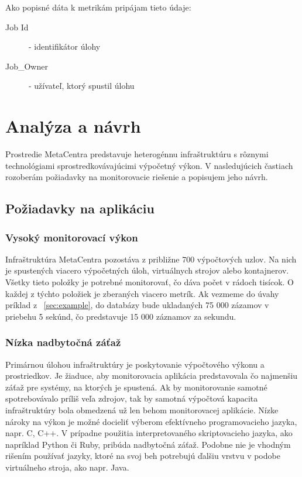 \documentclass[printed,11pt,twoside,color,cover,table]{fithesis3}
\begin{document}
Ako popisné dáta k metrikám pripájam tieto údaje:
\begin{description}
\item[Job Id] - identifikátor úlohy
\item[Job\_Owner] - užívateľ, ktorý spustil úlohu
\end{description}

\chapter{Analýza a návrh}
Prostredie MetaCentra predstavuje heterogénnu infraštruktúru s rôznymi technológiami sprostredkovávajúcimi výpočetný výkon. V nasledujúcich častiach 
rozoberám požiadavky na monitorovacie riešenie a popisujem jeho návrh.

\section{Požiadavky na aplikáciu}
\subsection{Vysoký monitorovací výkon}
Infraštruktúra MetaCentra pozostáva z približne 700 výpočtových uzlov. Na nich je spustených viacero výpočetných úloh, virtuálnych strojov alebo kontajnerov. Všetky tieto položky je potrebné 
monitorovať, čo dáva počet v rádoch tisícok. O každej z týchto položiek je zberaných viacero metrík. 
Ak vezmeme do úvahy príklad z ~\ref{sec:example}, do databázy bude ukladaných 75 000 zázamov v priebehu 5 sekúnd, čo predstavuje 15 000 záznamov za sekundu. 

\subsection{Nízka nadbytočná záťaž}
Primárnou úlohou infraštruktúry je poskytovanie výpočtového výkonu a prostriedkov. Je žiaduce, aby monitorovacia aplikácia predstavovala čo najmenšiu záťaž pre systémy, na ktorých je spustená. Ak by monitorovanie
samotné spotrebovávalo príliš veľa zdrojov, tak by samotná výpočtová kapacita infraštruktúry bola obmedzená už len behom
monitorovacej aplikácie. Nízke nároky na výkon je možné docieliť výberom efektívneho programovacieho jazyka, napr. C, C++. V prípadne použitia interpretovaného skriptovacieho jazyka, ako napríklad Python či Ruby, pribúda 
nadbytočná záťaž. Podobne nie je vhodným rišením používať jazyky, ktoré na svoj beh potrebujú ďalšiu vrstvu v podobe virtuálneho stroja, ako napr. Java.
\end{document}
